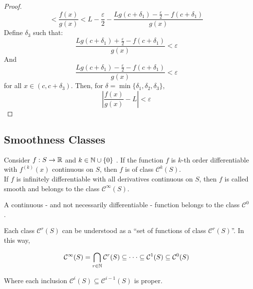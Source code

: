\begin{proof}
\begin{equation*}
        <
        \frac{f(x)}{g(x)}
        <
        L - \frac{\varepsilon}{2} - \frac{Lg(c+\delta_1) - \frac{\varepsilon}{2} - f(c+\delta_1)}{g(x)}
    \end{equation*}
    Define $\delta_3$ such that:
    \begin{equation*}
        \frac{Lg(c+\delta_1) + \frac{\varepsilon}{2} - f(c+\delta_1)}{g(x)} < \varepsilon
    \end{equation*}
    And
    \begin{equation*}
        \frac{Lg(c+\delta_1) - \frac{\varepsilon}{2} - f(c+\delta_1)}{g(x)} < \varepsilon
    \end{equation*}
    for all $x \in (c, c+ \delta_3)$. Then, for $\delta = \min \{ \delta_1, \delta_2, \delta_3 \}$,
    \begin{equation*}
        \left |
            \frac{f(x)}{g(x)} - L
        \right | < \varepsilon
    \end{equation*}
\end{proof}

\subsection{Smoothness Classes}

\begin{definition}
    Consider $f: S \to \mathbb{R}$ and $k \in \mathbb{N} \cup \{0\}$ . If the function $f$ is $k$-th order differentiable with $f^{(k)}(x)$ continuous on $S$, then $f$ is of class $\mathcal{C}^k(S)$. \\
    If $f$ is infinitely differentiable with all derivatives continuous on $S$, then $f$ is called smooth and belongs to the class $\mathcal{C}^\infty(S)$.
\end{definition}

\begin{remark}
    A continuous - and not necessarily differentiable - function belongs to the class $\mathcal{C}^0$.
\end{remark}

Each class $\mathcal{C}^r(S)$ can be understood as a ``set of functions of class $\mathcal{C}^r(S)$''. In this way,

\begin{equation*}
    \mathcal{C}^\infty(S) = \bigcap \limits_{r \in \mathbb{N}} \mathcal{C}^r(S) \subseteq \cdot \cdot \cdot \subseteq \mathcal{C}^1(S) \subseteq \mathcal{C}^0(S)
\end{equation*}

Where each inclusion $\mathcal{C}^i(S) \subseteq \mathcal{C}^{i-1}(S)$ is proper.